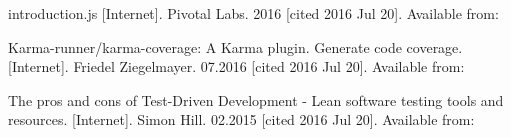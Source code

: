 \documentclass[11pt]{article}
\begin{document}
\begin{thebibliography}{9}
 introduction.js [Internet]. Pivotal Labs. 2016 [cited 2016 Jul 20]. Available from:

 Karma-runner/karma-coverage: A Karma plugin. Generate code coverage. [Internet]. Friedel Ziegelmayer. 07.2016 [cited 2016 Jul 20]. Available from:

 The pros and cons of Test-Driven Development - Lean software testing tools and resources. [Internet]. Simon Hill. 02.2015 [cited 2016 Jul 20]. Available from:

\end{thebibliography}
\end{document}
